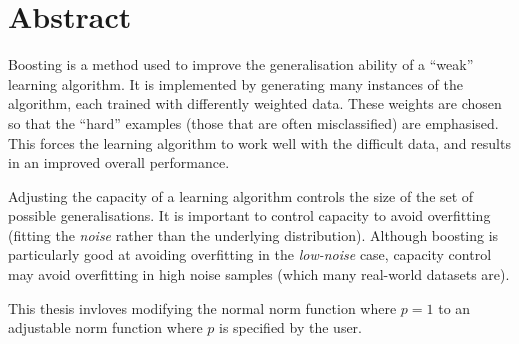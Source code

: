
\chapter{Abstract}

Boosting is a method used to improve the generalisation ability of a
``weak'' learning algorithm.  It is implemented by generating many
instances of the algorithm, each trained with differently weighted
data.  These weights are chosen so that the ``hard'' examples (those
that are often misclassified) are emphasised.  This forces the
learning algorithm to work well with the difficult data, and results
in an improved overall performance.

Adjusting the capacity of a learning algorithm controls the size of
the set of possible generalisations.  It is important to control
capacity to avoid overfitting (fitting the \emph{noise} rather than
the underlying distribution).  Although boosting is particularly good
at avoiding overfitting in the \emph{low-noise} case, capacity control
may avoid overfitting in high noise samples (which many real-world
datasets are).

This thesis invloves modifying the normal norm function where $p=1$ to
an adjustable norm function where $p$ is specified by the user.
